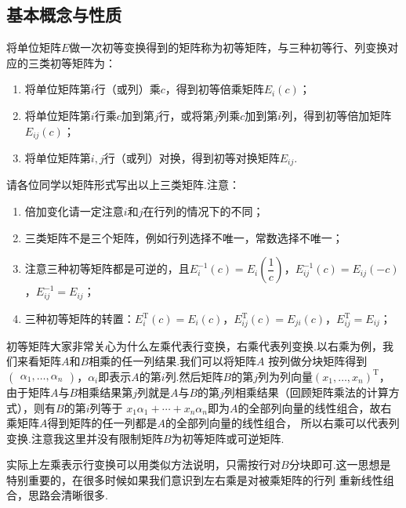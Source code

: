 \subsection{基本概念与性质}
\begin{definition}
    将单位矩阵$E$做一次初等变换得到的矩阵称为初等矩阵，与三种初等行、列变换对应的三类初等矩阵为：
    \begin{enumerate}
        \item 将单位矩阵第$i$行（或列）乘$c$，得到初等倍乘矩阵$E_i(c)$；

        \item 将单位矩阵第$i$行乘$c$加到第$j$行，或将第$j$列乘$c$加到第$i$列，得到初等倍加矩阵$E_{ij}(c)$；

        \item 将单位矩阵第$i,j$行（或列）对换，得到初等对换矩阵$E_{ij}$.
    \end{enumerate}
\end{definition}
请各位同学以矩阵形式写出以上三类矩阵.注意：
\begin{enumerate}
    \item 倍加变化请一定注意$i$和$j$在行列的情况下的不同；

    \item 三类矩阵不是三个矩阵，例如行列选择不唯一，常数选择不唯一；

    \item 注意三种初等矩阵都是可逆的，且$E_i^{-1}(c)=E_i\left(\dfrac{1}{c}\right)$，$E_{ij}^{-1}(c)=E_{ij}(-c)$，$E_{ij}^{-1}=E_{ij}$；

    \item 三种初等矩阵的转置：$E_i^\mathrm{T}(c)=E_i(c)$，$E_{ij}^\mathrm{T}(c)=E_{ji}(c)$，$E_{ij}^\mathrm{T}=E_{ij}$；
\end{enumerate}

初等矩阵大家非常关心为什么左乘代表行变换，右乘代表列变换.以右乘为例，我们来看矩阵$A$和$B$相乘的任一列结果.我们可以将矩阵$A$
按列做分块矩阵得到$\begin{pmatrix}\alpha_1,\ldots,\alpha_n\end{pmatrix}$，$\alpha_i$即表示$A$的第$i$列.然后矩阵$B$的第$j$列为列向量$(x_1,\ldots,x_n)^\mathrm{T}$，
由于矩阵$A$与$B$相乘结果第$j$列就是$A$与$B$的第$j$列相乘结果（回顾矩阵乘法的计算方式），则有$B$的第$i$列等于
$x_1\alpha_1+\cdots+x_n\alpha_n$即为$A$的全部列向量的线性组合，故右乘矩阵$A$得到矩阵的任一列都是$A$的全部列向量的线性组合，
所以右乘可以代表列变换.注意我这里并没有限制矩阵$B$为初等矩阵或可逆矩阵.

实际上左乘表示行变换可以用类似方法说明，只需按行对$B$分块即可.这一思想是特别重要的，在很多时候如果我们意识到左右乘是对被乘矩阵的行列
重新线性组合，思路会清晰很多.

